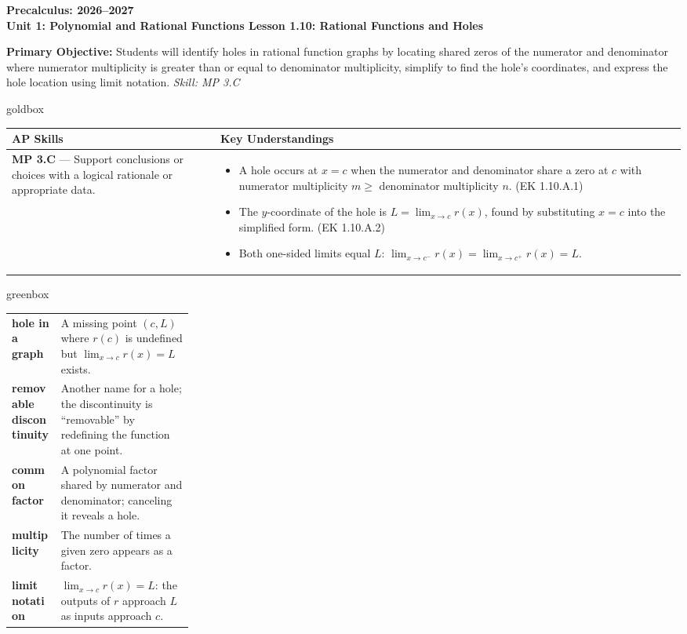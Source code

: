 \documentclass[10pt]{article}
\newcommand{\CourseName}{Precalculus}
\newcommand{\SchoolYear}{2026--2027}
\newcommand{\UnitNumberName}{Unit 1: Polynomial and Rational Functions \quad}
\newcommand{\LessonNumberName}{Lesson 1.10: Rational Functions and Holes}
\begin{document}
\begin{center}
    {\Large\bfseries \CourseName: \SchoolYear \\
    {\small\bfseries \UnitNumberName \LessonNumberName}}
\end{center}

\begin{tcolorbox}[colback=sky, colframe=navy, boxrule=0.9pt, arc=2mm,
    left=2mm, right=2mm, top=1.5mm, bottom=1.5mm]
    \textbf{Primary Objective:} Students will identify holes in rational function graphs by
    locating shared zeros of the numerator and denominator where numerator multiplicity is
    greater than or equal to denominator multiplicity, simplify to find the hole's coordinates,
    and express the hole location using limit notation.
    \hfill\textit{\small Skill: MP 3.C}
\end{tcolorbox}

\renewcommand{\arraystretch}{1.6}
\begin{skillbox}{goldbox}
\begin{tabularx}{\linewidth}{@{}X X@{}}
\textbf{AP Skills} &
\textbf{Key Understandings} \\
\midrule
\textbf{MP 3.C} --- Support conclusions or choices with a logical rationale or appropriate data. &
\begin{itemize}[leftmargin=1.2em,itemsep=2pt,topsep=0pt]
  \item A hole occurs at $x = c$ when the numerator and denominator share a zero at $c$ with
        numerator multiplicity $m \geq$ denominator multiplicity $n$. (EK 1.10.A.1)
  \item The $y$-coordinate of the hole is $L = \lim_{x \to c} r(x)$, found by substituting
        $x = c$ into the simplified form. (EK 1.10.A.2)
  \item Both one-sided limits equal $L$: $\lim_{x \to c^-} r(x) = \lim_{x \to c^+} r(x) = L$.
\end{itemize} \\
\end{tabularx}
\end{skillbox}

\begin{skillbox}{greenbox}
\renewcommand{\arraystretch}{1.4}
\begin{tabularx}{\linewidth}{@{} >{\bfseries\color{navy}}p{0.27\linewidth} X @{}}
hole in a graph         & A missing point $(c, L)$ where $r(c)$ is undefined but $\lim_{x \to c} r(x) = L$ exists. \\
removable discontinuity & Another name for a hole; the discontinuity is ``removable'' by redefining the function at one point. \\
common factor           & A polynomial factor shared by numerator and denominator; canceling it reveals a hole. \\
multiplicity            & The number of times a given zero appears as a factor. \\
limit notation          & $\lim_{x \to c} r(x) = L$: the outputs of $r$ approach $L$ as inputs approach $c$. \\
\end{tabularx}
\end{skillbox}
\end{document}
